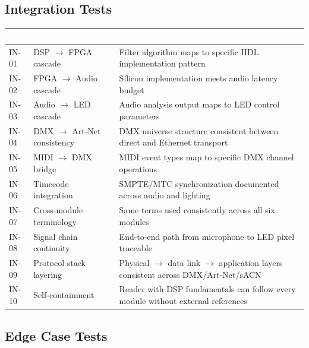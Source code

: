 \documentclass[11pt,letterpaper]{article}
\newcommand{\tableheader}[1]{\textbf{\sffamily\textcolor{white}{#1}}}
\begin{document}
\subsection{Integration Tests}

\begin{center}
\begin{tabularx}{\textwidth}{C{1.2cm}L{3.5cm}X}
\toprule
{}
\tableheader{ID} & \tableheader{Verifies} & \tableheader{Expected Behavior} \\
\midrule
IN-01 & DSP $\to$ FPGA cascade & Filter algorithm maps to specific HDL implementation pattern \\
IN-02 & FPGA $\to$ Audio cascade & Silicon implementation meets audio latency budget \\
IN-03 & Audio $\to$ LED cascade & Audio analysis output maps to LED control parameters \\
IN-04 & DMX $\to$ Art-Net consistency & DMX universe structure consistent between direct and Ethernet transport \\
IN-05 & MIDI $\to$ DMX bridge & MIDI event types map to specific DMX channel operations \\
IN-06 & Timecode integration & SMPTE/MTC synchronization documented across audio and lighting \\
IN-07 & Cross-module terminology & Same terms used consistently across all six modules \\
IN-08 & Signal chain continuity & End-to-end path from microphone to LED pixel traceable \\
IN-09 & Protocol stack layering & Physical $\to$ data link $\to$ application layers consistent across DMX/Art-Net/sACN \\
IN-10 & Self-containment & Reader with DSP fundamentals can follow every module without external references \\
\bottomrule
\end{tabularx}
\end{center}

\subsection{Edge Case Tests}
\end{document}

